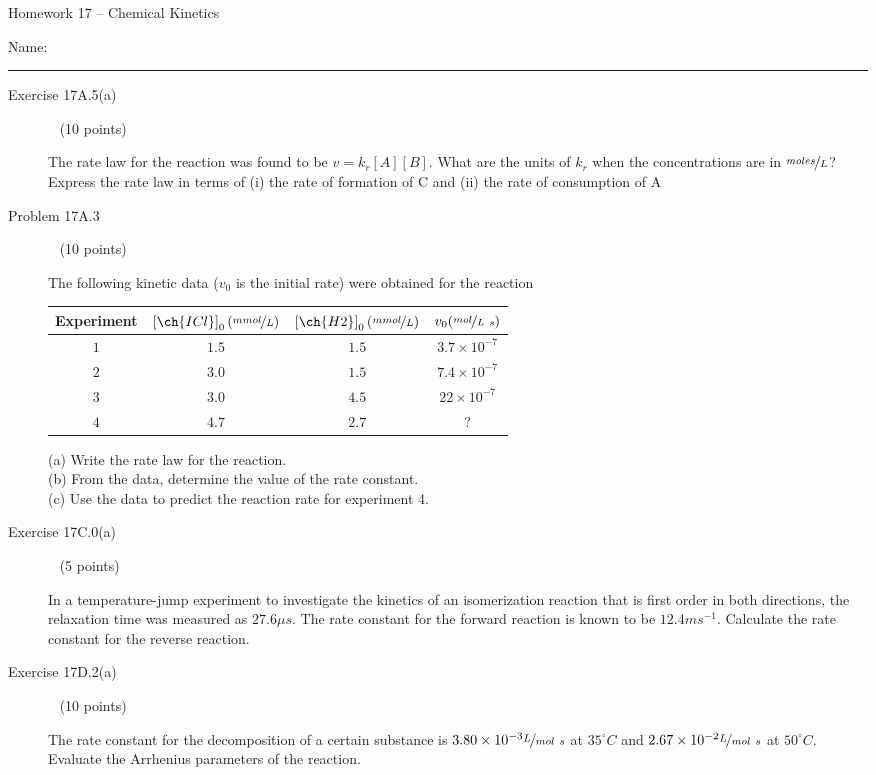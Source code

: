 \documentclass[12pt, openany, letterpaper]{memoir}
\begin{document}
\begin{center}
	{\large Homework 17 -- Chemical Kinetics}
\end{center}

Name: \rule[-.1mm]{15em}{0.1pt}

\begin{description}	
	\item [Exercise 17A.5(a)] ~ (10 points)
	
	The rate law for the reaction  was found to be $v=k_r[A][B]$. What are the units of $k_r$ when the concentrations are in $\nicefrac{moles}{L}$? Express the rate law in terms of (i) the rate of formation of C and (ii) the rate of consumption of A
	
	\vspace{10em}
	\item [Problem 17A.3] ~ (10 points)
	
	
	The following kinetic data ($v_0$ is the initial rate) were obtained for the reaction \\
	
	\begin{tabular}{cccc}
		Experiment & $\left[\ch{ICl}\right]_0 (\nicefrac{mmol}{L})$ & $\left[\ch{H2}\right]_0 (\nicefrac{mmol}{L})$ & $v_0 (\nicefrac{mol}{L~s})$ \\ \midrule
		$1$ & $1.5$ & $1.5$ & $3.7\times10^{-7}$\\
		$2$ & $3.0$ & $1.5$ & $7.4\times10^{-7}$\\
		$3$ & $3.0$ & $4.5$ & $22\times10^{-7}$\\
		$4$ & $4.7$ & $2.7$ & ?\\
	\end{tabular}
	
	(a) Write the rate law for the reaction. \\
	(b) From the data, determine the value of the rate constant. \\
	(c) Use the data to predict the reaction rate for experiment 4.
	
	\vspace{18em}
	\item [Exercise 17C.0(a)] ~ (5 points)
	
	In a temperature-jump experiment to investigate the kinetics of an isomerization reaction that is first order in both directions, the relaxation time was measured as $27.6\mu s$. The rate constant for the forward reaction is known to be $12.4 ms^{-1}$. Calculate the rate constant for the reverse reaction.
	
	\vspace{5em}
	\item [Exercise 17D.2(a)] ~ (10 points)
	
	The rate constant for the decomposition of a certain substance is $3.80\times10^{-3}\nicefrac{L}{mol~s}$ at $35^\circ C$ and $2.67\times10^{-2}\nicefrac{L}{mol~s}$ at $50^\circ C$. Evaluate the Arrhenius parameters of the reaction.
	
	

\end{description}
\newpage
\pagestyle{empty}
\addtocounter{page}{-1}
\end{document}
